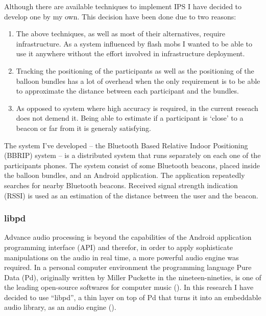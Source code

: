 
Although there are available techniques to implement IPS I have decided to develop one by my own.
This decision have been done due to two reasons:
\begin{enumerate}
	\item The above techniques, as well as most of their alternatives, require infrastructure.
	As a system influenced by flash mobs I wanted to be able to use it anywhere without the effort involved in infrastructure deployment.
	\item Tracking the positioning of the participants as well as the positioning of the balloon bundles has a lot of overhead when the only requirement is to be able to approximate the distance between each participant and the bundles.
	\item As opposed to system where high accuracy is required, in the current reseach does not demend it.
	Being able to estimate if a participant is `close' to a beacon or far from it is generaly satisfying.
\end{enumerate}


The system I've developed -- the Bluetooth Based Relative Indoor Positioning (BBRIP) system -- is a distributed system that runs separately on each one of the participants phones.
The system consist of some Bluetooth beacons, placed inside the balloon bundles, and an Android application.
The application repeatedly searches for nearby Bluetooth beacons.
Received signal strength indication (RSSI) is used as an estimation of the distance between the user and the beacon.

\subsubsection{libpd}\label{methods:libpd}

Advance audio processing is beyond the capabilities of the Android application programming interface (API) and therefor, in order to apply sophisticate manipulations on the audio in real time, a more powerful audio engine was required.
In a personal computer environment the programming language Pure Data (Pd), originally written by Miller Puckette in the nineteen-nineties, is one of the leading open-source softwares for computer music (\cite{web:pd}).
In this research I have decided to use ``libpd'', a thin layer on top of Pd that turns it into an embeddable audio library, as an audio engine (\cite[page v]{brinkmann12}).

